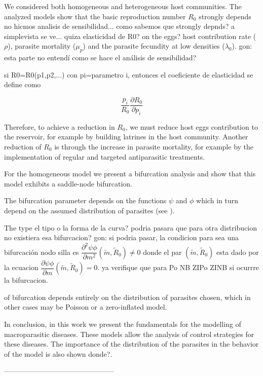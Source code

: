 \documentclass[12pt,a4paper]{article}
\theoremstyle{plain}%
\theoremstyle{definition}
\theoremstyle{remark}
\begin{document}
We considered both homogeneous and heterogeneous host communities. 
The analyzed models show that the basic reproduction number $R_0$ strongly depends 
{\color{red} no hicmos analisis de sensibilidad... como
sabemos que strongly depnds? a simplevista se ve... quiza elasticidad de R0?} 
on the {\color{red}eggs?} host contribution rate ($\rho$), parasite mortality ($\mu_p$)
and the  parasite fecundity at low densities ($\lambda_0 $). {\color{blue} gon: esta parte no entendí como se hace el análisis de sensibilidad?}

{\color{red} si R0=R0(p1,p2,...) con pi=parametro i, entonces el coeficiente de elasticidad se define como

$$
\frac{p_i}{R_0}\frac{\partial R_0}{\partial p_i}
$$


Therefore, to achieve a reduction in $R_0$, we must reduce host eggs contribution to the reservoir, for example by building latrines in the host community. Another reduction of $R_0$ is through the increase in parasite mortality, for example by the implementation
of regular and targeted antiparasitic treatments.

For the homogeneous model we present a bifurcation analysis and show that this model exhibits a saddle-node bifurcation.

The bifurcation parameter depends on the functions $\psi$ and $\phi$ which in turn depend on the assumed
distribution of parasites (see \cite{lopez2022general}).

The type {\color{red} el tipo o la forma de la curva? podria pasara
	que para otra distribucion no existiera esa bifurcacion?}
{\color{blue}gon: si podria pasar, la condicion para sea una bifurcación nodo silla es $\dfrac{\partial^2 \psi \phi }{\partial m^2}(\tilde m, \tilde R_0)\neq0$ donde el par  $(\tilde m, \tilde R_0)$ esta dado por la ecuacion $\dfrac{\partial \psi \phi }{\partial m}(\tilde m, \tilde R_0)=0$. ya verifique que para Po NB ZIPo ZINB si ocurrre la bifurcacion.}

of bifurcation depends entirely on
the distribution of parasites chosen, which in other cases may be Poisson or
a zero-inflated model.

In conclusion, in this work we present the fundamentals for the modelling of macroparasitic diseases. These models allow the analysis of control strategies for these diseases. 
The importance of the distribution of the parasites in the behavior of the model is also shown {\color{red} donde?}.

-----------------------------------------------

}
\end{document}
